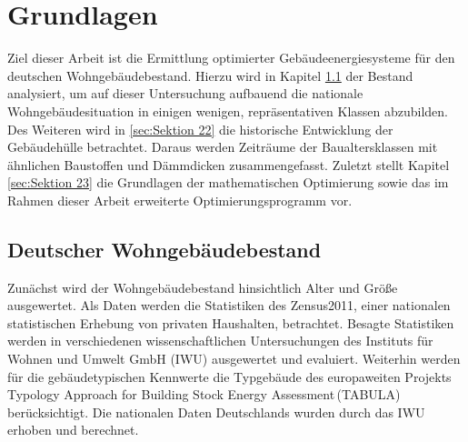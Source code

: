 \chapter{Grundlagen}

Ziel dieser Arbeit ist die Ermittlung optimierter Gebäudeenergiesysteme für den deutschen Wohngebäudebestand.
Hierzu wird in Kapitel \ref{sec:Sektion 21} der Bestand analysiert, um auf dieser Untersuchung aufbauend die nationale Wohngebäudesituation in einigen wenigen, repräsentativen Klassen abzubilden. 
Des Weiteren wird in \ref{sec:Sektion 22} die historische Entwicklung der Gebäudehülle betrachtet. Daraus werden Zeiträume der Baualtersklassen mit ähnlichen Baustoffen und Dämmdicken zusammengefasst. 
Zuletzt stellt Kapitel \ref{sec:Sektion 23} die Grundlagen der mathematischen Optimierung sowie das im Rahmen dieser Arbeit erweiterte Optimierungsprogramm vor. 




\section{Deutscher Wohngebäudebestand}
\label{sec:Sektion 21}

Zunächst wird der Wohngebäudebestand hinsichtlich Alter und Größe ausgewertet.
Als Daten werden die Statistiken des Zensus2011, einer nationalen statistischen Erhebung von privaten Haushalten, betrachtet. 
Besagte Statistiken werden in verschiedenen wissenschaftlichen Untersuchungen des Instituts für Wohnen und Umwelt GmbH (IWU) ausgewertet und evaluiert.
Weiterhin werden für die gebäudetypischen Kennwerte die Typgebäude des europaweiten Projekts \glqq Typology Approach for Building Stock Energy Assessment\grqq\,(TABULA) berücksichtigt. Die nationalen Daten Deutschlands wurden durch das IWU erhoben und berechnet.

